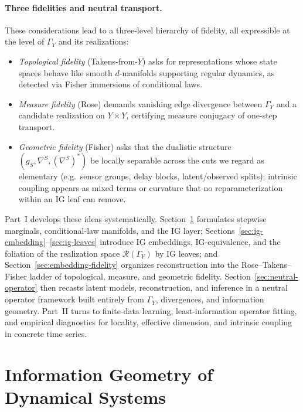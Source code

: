 \documentclass[11pt]{article}
\newcommand{\1}{\mathbf{1}}
\begin{document}
\paragraph{Three fidelities and neutral transport.}
These considerations lead to a three-level hierarchy of fidelity, all expressible at the level of $\Gamma_Y$ and its realizations:
\begin{itemize}[leftmargin=1.5em]
  \item \emph{Topological fidelity} (Takens-from-$Y$) asks for representations whose state spaces behave like smooth $d$-manifolds supporting regular dynamics, as detected via Fisher immersions of conditional laws.
  \item \emph{Measure fidelity} (Rose) demands vanishing edge divergence between $\Gamma_Y$ and a candidate realization on $Y\times Y$, certifying measure conjugacy of one-step transport.
  \item \emph{Geometric fidelity} (Fisher) asks that the dualistic structure $(g_S,\nabla^S,(\nabla^S)^\ast)$ be locally separable across the cuts we regard as elementary (e.g.\ sensor groups, delay blocks, latent/observed splits); intrinsic coupling appears as mixed terms or curvature that no reparameterization within an IG leaf can remove.
\end{itemize}

Part~I develops these ideas systematically. Section~\ref{sec:ig-dynamics} formulates stepwise marginals, conditional-law manifolds, and the IG layer; Sections~\ref{sec:ig-embedding}–\ref{sec:ig-leaves} introduce IG embeddings, IG-equivalence, and the foliation of the realization space $\mathcal{R}(\Gamma_Y)$ by IG leaves; and Section~\ref{sec:embedding-fidelity} organizes reconstruction into the Rose--Takens--Fisher ladder of topological, measure, and geometric fidelity. Section~\ref{sec:neutral-operator} then recasts latent models, reconstruction, and inference in a neutral operator framework built entirely from $\Gamma_Y$, divergences, and information geometry. Part~II turns to finite-data learning, least-information operator fitting, and empirical diagnostics for locality, effective dimension, and intrinsic coupling in concrete time series.

\newpage


\section{Information Geometry of Dynamical Systems}
\label{sec:ig-dynamics}
\end{document}
